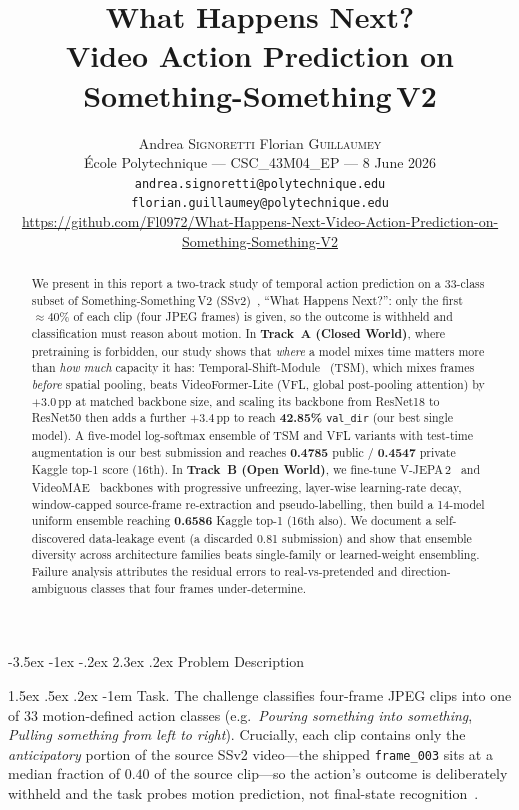 \documentclass[10pt,twocolumn,letterpaper]{article}
\title{%
  \textbf{What Happens Next?}\\[0.15em]
  \textbf{Video Action Prediction on Something-Something\,V2}}
\author{%
  Andrea \textsc{Signoretti}
  \quad
  Florian \textsc{Guillaumey}\\[0.3em]
  \small{\'Ecole Polytechnique --- CSC\_43M04\_EP --- 8 June 2026}\\
  \scriptsize{\texttt{andrea.signoretti@polytechnique.edu}\quad
  \texttt{florian.guillaumey@polytechnique.edu}
  }\\
  \scriptsize{\url{https://github.com/Fl0972/What-Happens-Next-Video-Action-Prediction-on-Something-Something-V2}}
}
\makeatletter
\renewcommand\section{\@startsection{section}{1}{\z@}%
  {-3.5ex \@plus -1ex \@minus -.2ex}%
  {2.3ex \@plus.2ex}%
  {\normalfont\Large\bfseries}}
\renewcommand\paragraph{\@startsection{paragraph}{4}{\z@}%
  {1.5ex \@plus .5ex \@minus .2ex}%
  {-1em}%
  {\normalfont\normalsize\bfseries}}
\makeatother
\begin{document}
\maketitle
\thispagestyle{plain}
\pagestyle{plain}
\vspace{-1.0em}

\begin{abstract}
We present in this report a two-track study of temporal action prediction on a 33-class subset
of Something-Something\,V2 (SSv2)~\cite{goyal2017ssv2}, ``What Happens Next?'':
only the first ${\approx}40\%$ of each clip (four JPEG frames) is given, so the
outcome is withheld and classification must reason about motion. In
\textbf{Track~A (Closed World)}, where pretraining is forbidden, our study shows that
\emph{where} a model mixes time matters more than \emph{how much} capacity it
has: Temporal-Shift-Module~\cite{lin2019tsm} (TSM), which mixes frames
\emph{before} spatial pooling, beats VideoFormer-Lite (VFL, global
post-pooling attention) by $+3.0$\,pp at matched backbone size, and scaling
its backbone from ResNet18 to ResNet50 then adds a further $+3.4$\,pp to reach
\textbf{42.85\%} \texttt{val\_dir} (our best single model). A five-model
log-softmax ensemble of TSM and VFL variants with test-time augmentation is our best submission and 
reaches \textbf{0.4785} public / \textbf{0.4547} private Kaggle top-1 score (16th). In
\textbf{Track~B (Open World)}, we fine-tune V-JEPA\,2~\cite{bardes2025vjepa2}
and VideoMAE~\cite{tong2022videomae} backbones with progressive unfreezing,
layer-wise learning-rate decay, window-capped source-frame re-extraction and
pseudo-labelling, then build a 14-model uniform ensemble reaching
\textbf{0.6586} Kaggle top-1 (16th also). We document a
self-discovered data-leakage event (a discarded 0.81 submission) and show that
ensemble diversity across architecture families beats single-family or
learned-weight ensembling. Failure analysis attributes the residual errors to
real-vs-pretended and direction-ambiguous classes that four frames
under-determine.
\end{abstract}

\section{Problem Description}
\label{sec:problem}

\paragraph{Task.}
The challenge classifies four-frame JPEG clips into one of 33 motion-defined
action classes (e.g.\ \emph{Pouring something into something}, \emph{Pulling
something from left to right}). Crucially, each clip contains only the
\emph{anticipatory} portion of the source SSv2 video---the shipped
\texttt{frame\_003} sits at a median fraction of $0.40$ of the source clip---so
the action's outcome is deliberately withheld and the task probes motion
prediction, not final-state recognition~\cite{goyal2017ssv2}.
\end{document}

